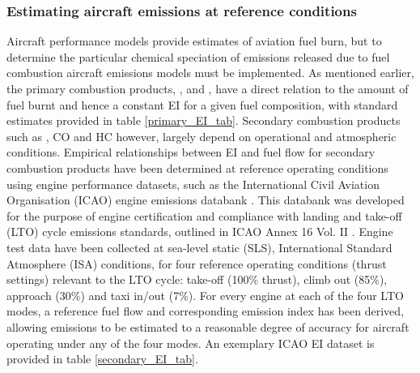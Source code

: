 \subsubsection{Estimating aircraft emissions at reference conditions}
Aircraft performance models provide estimates of aviation fuel burn, but to determine the particular chemical speciation of emissions released due to fuel combustion aircraft emissions models must be implemented. As mentioned earlier, the primary combustion products, ,  and , have a direct relation to the amount of fuel burnt and hence a constant EI for a given fuel composition, with standard estimates provided in table \ref{primary_EI_tab}. Secondary combustion products such as , CO and HC however, largely depend on operational and atmospheric conditions. Empirical relationships between EI and fuel flow for secondary combustion products have been determined at reference operating conditions using engine performance datasets, such as the International Civil Aviation Organisation (ICAO) engine emissions databank \cite{ICAOEEDB}.  This databank was developed for the purpose of engine certification and compliance with landing and take-off (LTO) cycle emissions standards, outlined in ICAO Annex 16 Vol. II \cite{ICAO2008}. Engine test data have been collected at sea-level static (SLS), International Standard Atmosphere (ISA) conditions, for four reference operating conditions (thrust settings) relevant to the LTO cycle: take-off (100\% thrust), climb out (85\%), approach (30\%) and taxi in/out (7\%). For every engine at each of the four LTO modes, a reference fuel flow and corresponding emission index has been derived, allowing emissions to be estimated to a reasonable degree of accuracy for aircraft operating under any of the four modes. An exemplary ICAO EI dataset is provided in table \ref{secondary_EI_tab}.




